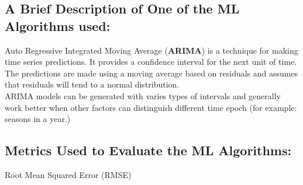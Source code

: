 \documentclass[]{article}
\begin{document}
\subsection*{A Brief Description of One of the ML Algorithms used:}
Auto Regressive Integrated Moving Average (\textbf{ARIMA}) is a technique for making time series predictions. It provides a confidence interval for the next unit of time.
The predictions are made using a moving average based on residuals and assumes that residuals will tend to a normal distribution. \\
ARIMA models can be generated with varies types of intervals and generally work better when other factors can distinguish different time epoch (for example: seasons in a year.) 

\subsection*{Metrics Used to Evaluate the ML Algorithms:}
Root Mean Squared Error (RMSE)
\end{document}
